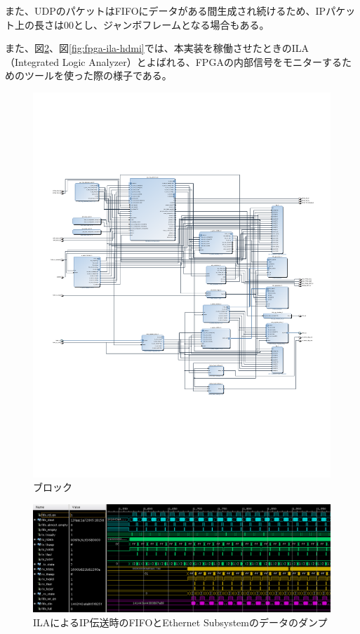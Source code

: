 また、UDPのパケットはFIFOにデータがある間生成され続けるため、IPパケット上の長さは00とし、ジャンボフレームとなる場合もある。

また、図\ref{fig:fpga-ila-fifo-to-eth}、図\ref{fig:fpga-ila-hdmi}では、本実装を稼働させたときのILA（Integrated Logic Analyzer）とよばれる、FPGAの内部信号をモニターするためのツールを使った際の様子である。

\begin{figure}[htbp]
  \begin{center}
    \includegraphics[bb=0 0 612 792,width=15.5cm]{img/ethlogic_template_ss.pdf}
  \end{center}
  \caption{ブロック}
  \label{fig:ethlogic_template_ss}
\end{figure}

\begin{figure}[htbp]
  \begin{center}
    \includegraphics[bb=0 0 1201 438,width=15.5cm]{img/fpga-ila-fifo-to-eth.png}
  \end{center}
  \caption{ILAによるIP伝送時のFIFOとEthernet Subsystemのデータのダンプ}
  \label{fig:fpga-ila-fifo-to-eth}
\end{figure}

